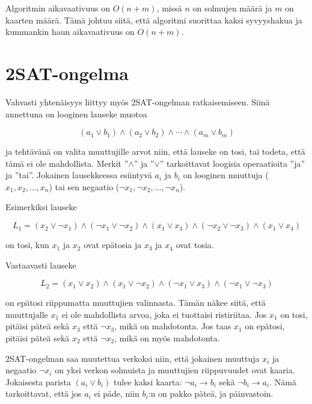 Algoritmin aikavaativuus on $O(n+m)$,
missä $n$ on solmujen määrä ja $m$ on kaarten määrä.
Tämä johtuu siitä,
että algoritmi suorittaa kaksi syvyyshakua ja
kummankin haun aikavaativuus on $O(n+m)$.

\section{2SAT-ongelma}

Vahvasti yhtenäisyys liittyy myös 2SAT-ongelman ratkaisemiseen.
Siinä annettuna on looginen lauseke muotoa

\[
(a_1 \lor b_1) \land (a_2 \lor b_2) \land \cdots \land (a_m \lor b_m)
\]

ja tehtävänä on valita muuttujille arvot niin,
että lauseke on tosi,
tai todeta, että tämä ei ole mahdollista.
Merkit ''$\land$'' ja ''$\lor$'' tarkoittavat
loogisia operaatioita ''ja'' ja ''tai''.
Jokainen lausekkeessa esiintyvä $a_i$ ja $b_i$ on looginen muuttuja
($x_1,x_2,\ldots,x_n$)
tai sen negaatio ($\lnot x_1, \lnot x_2, \ldots, \lnot x_n$).

Esimerkiksi lauseke

\[
L_1 = (x_2 \lor \lnot x_1) \land
      (\lnot x_1 \lor \lnot x_2) \land
      (x_1 \lor x_3) \land
      (\lnot x_2 \lor \lnot x_3) \land
      (x_1 \lor x_4)
\]

on tosi, kun $x_1$ ja $x_2$ ovat epätosia
ja $x_3$ ja $x_4$ ovat tosia.

Vastaavasti lauseke

\[
L_2 = (x_1 \lor x_2) \land
      (x_1 \lor \lnot x_2) \land
      (\lnot x_1 \lor x_3) \land
      (\lnot x_1 \lor \lnot x_3)
\]

on epätosi riippumatta muuttujien valinnasta.
Tämän näkee siitä, että muuttujalle $x_1$
ei ole mahdollista arvoa, joka ei tuottaisi ristiriitaa.
Jos $x_1$ on tosi, pitäisi päteä sekä $x_3$ että $\lnot x_3$,
mikä on mahdotonta.
Jos taas $x_1$ on epätosi,
pitäisi päteä sekä $x_2$ että $\lnot x_2$,
mikä on myös mahdotonta.

2SAT-ongelman saa muutettua verkoksi niin,
että jokainen muuttuja $x_i$ ja negaatio $\lnot x_i$
on yksi verkon solmuista
ja muuttujien riippuvuudet ovat kaaria.
Jokaisesta parista $(a_i \lor b_i)$ tulee kaksi
kaarta: $\lnot a_i \to b_i$ sekä $\lnot b_i \to a_i$.
Nämä tarkoittavat, että jos $a_i$ ei päde,
niin $b_i$:n on pakko päteä, ja päinvastoin.

